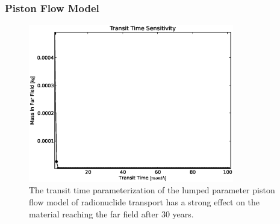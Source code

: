 \begin{frame}[ctb!]
\frametitle{Piston Flow Model} 
\begin{figure}[ht]
\centering
\includegraphics[width=0.8\textwidth]{./images/lpPFM_t_t.eps}
\caption[Lumped Parameter Piston Flow Model Transit Time Sensitivity]{The transit time 
parameterization of the lumped parameter piston flow model of radionuclide 
transport has a strong effect on the material reaching the far field after 30 
years.  }
\label{fig:lp_t_t_end}
\end{figure}

\end{frame}
